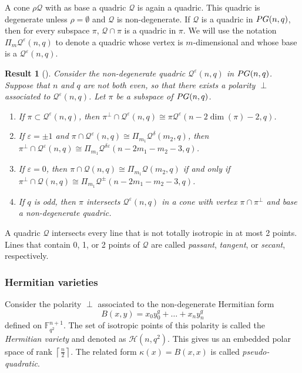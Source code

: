 \documentclass[a4paper]{article}
\newtheorem{res}[thm]{Result}
\theoremstyle{definition}
\newcommand{\eps}{\varepsilon}
\newcommand{\FF}{\mathbb F}
\newcommand{\pg}{\textnormal{PG}}
\newcommand{\ceil}[1]{\left \lceil #1 \right \rceil}
\newcommand{\mq}{\mathcal Q}
\newcommand{\mh}{\mathcal H}
\newcommand{\sam}[1]{\textcolor{purple}{#1}}
\newcommand{\maarten}[1]{\textcolor{orange}{#1}}
\begin{document}
A cone $\rho \mq$ with as base a quadric $\mq$ is again a quadric.
This quadric is degenerate unless $\rho = \emptyset$ and $\mq$ is non-degenerate.
If $\mq$ is a quadric in $\pg(n,q)$, then for every subspace $\pi$, $\mq \cap \pi$ is a quadric in $\pi$.
We will use the notation $\Pi_m \mq^\eps(n,q)$ to denote a quadric whose vertex is $m$-dimensional and whose base is a $\mq^\eps(n,q)$.

\begin{res}[{\cite[\S 1.7]{hirschfeldthas}}]
 Consider the non-degenerate quadric $\mq^\eps(n,q)$ in $\pg(n,q)$.
 Suppose that $n$ and $q$ are not both even, so that there exists a polarity $\perp$ associated to $\mq^\eps(n,q)$.
 Let $\pi$ be a subspace of $\pg(n,q)$.
 \begin{enumerate}
  \item If $\pi \subset \mq^\eps(n,q)$, then $\pi^\perp \cap \mq^\eps(n,q) \cong \pi \mq^\eps(n-2\dim(\pi)-2,q)$.
  \item If $\eps = \pm 1$ and $\pi \cap \mq^\eps(n,q) \cong \Pi_{m_1} \mq^\delta(m_2,q)$, then $\pi^\perp \cap \mq^\eps(n,q) \cong \Pi_{m_1} \mq^{\delta \eps}(n-2m_1 - m_2 - 3,q)$.
  \item If $\eps = 0$, then $\pi \cap \mq(n,q) \cong \Pi_{m_1} \mq(m_2,q)$ if and only if $\pi^\perp \cap \mq(n,q) \cong \Pi_{m_1} \mq^{\pm}(n-2m_1-m_2-3,q)$.%
  \item If $q$ is odd, then $\pi$ intersects $\mq^\eps(n,q)$ in a cone with vertex $\pi \cap \pi^\perp$ and base a non-degenerate quadric.
 \end{enumerate}
\end{res}

A quadric $\mq$ intersects every line that is not totally isotropic in at most 2 points.
Lines that contain 0, 1, or 2 points of $\mq$ are called \emph{passant}, \emph{tangent}, or \emph{secant}, respectively.



\subsubsection{Hermitian varieties}

Consider the polarity $\perp$ associated to the non-degenerate Hermitian form
\[
 B(x,y) = x_0 y_0^q + \ldots + x_n y_n^q
\]
defined on $\FF_{q^2}^{n+1}$.
The set of isotropic points of this polarity is called the \emph{Hermitian variety} and denoted as $\mh(n,q^2)$.
This gives us an embedded polar space of rank $\ceil {\frac n2}$.
The related form $\kappa(x) = B(x,x)$ is called \emph{pseudo-quadratic}.
\end{document}
